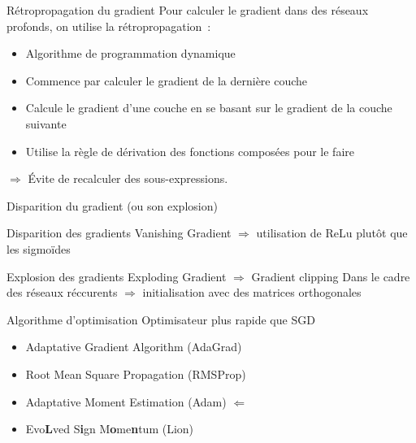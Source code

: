 \begin{frame}{Rétropropagation du gradient}
  Pour calculer le gradient dans des réseaux profonds, on utilise la rétropropagation~:

  \begin{itemize}
    \item Algorithme de programmation dynamique
    \item Commence par calculer le gradient de la dernière couche
    \item Calcule le gradient d'une couche en se basant sur le gradient de la couche suivante
    \item Utilise la règle de dérivation des fonctions composées pour le faire
  \end{itemize}

  $\Rightarrow$ Évite de recalculer des sous-expressions.
\end{frame}

\begin{frame}{Disparition du gradient (ou son explosion)}
\end{frame}

\begin{frame}{Disparition des gradients}
  Vanishing Gradient $\Rightarrow$ utilisation de ReLu plutôt que les sigmoïdes
  \vfill
\end{frame}

\begin{frame}{Explosion des gradients}
  Exploding Gradient $\Rightarrow$ Gradient clipping
  Dans le cadre des réseaux réccurents $\Rightarrow$ initialisation avec des matrices orthogonales
\end{frame}

\begin{frame}{Algorithme d'optimisation}
  Optimisateur plus rapide que SGD
  \begin{itemize}
    \item Adaptative Gradient Algorithm (AdaGrad)
    \item Root Mean Square Propagation (RMSProp)
    \item Adaptative Moment Estimation (Adam)    $\Leftarrow$
    \item Evo\textbf{L}ved S\textbf{i}gn M\textbf{o}me\textbf{n}tum (Lion)
  \end{itemize}
\end{frame}

